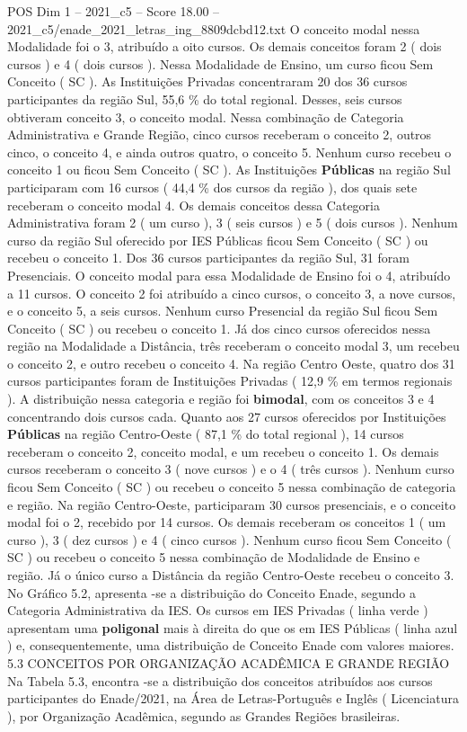 \begin{textsample}{POS Dim 1 – 2021\_c5 – Score 18.00 – 2021\_c5/enade\_2021\_letras\_ing\_8809dcbd12.txt}
O conceito modal nessa Modalidade foi o 3, atribuído a oito cursos.
Os demais conceitos foram 2 ( dois cursos ) e 4 ( dois cursos ).
Nessa Modalidade de Ensino, um curso ficou Sem Conceito ( SC ).
As Instituições Privadas concentraram 20 dos 36 cursos participantes da região Sul, 55,6 \% do total regional.
Desses, seis cursos obtiveram conceito 3, o conceito modal.
Nessa combinação de Categoria Administrativa e Grande Região, cinco cursos receberam o conceito 2, outros cinco, o conceito 4, e ainda outros quatro, o conceito 5.
Nenhum curso recebeu o conceito 1 ou ficou Sem Conceito ( SC ).
As Instituições \textbf{Públicas} na região Sul participaram com 16 cursos ( 44,4 \% dos cursos da região ), dos quais sete receberam o conceito modal 4.
Os demais conceitos dessa Categoria Administrativa foram 2 ( um curso ), 3 ( seis cursos ) e 5 ( dois cursos ).
Nenhum curso da região Sul oferecido por IES Públicas ficou Sem Conceito ( SC ) ou recebeu o conceito 1.
Dos 36 cursos participantes da região Sul, 31 foram Presenciais.
O conceito modal para essa Modalidade de Ensino foi o 4, atribuído a 11 cursos.
O conceito 2 foi atribuído a cinco cursos, o conceito 3, a nove cursos, e o conceito 5, a seis cursos.
Nenhum curso Presencial da região Sul ficou Sem Conceito ( SC ) ou recebeu o conceito 1.
Já dos cinco cursos oferecidos nessa região na Modalidade a Distância, três receberam o conceito modal 3, um recebeu o conceito 2, e outro recebeu o conceito 4.
Na região Centro Oeste, quatro dos 31 cursos participantes foram de Instituições Privadas ( 12,9 \% em termos regionais ).
A distribuição nessa categoria e região foi \textbf{bimodal}, com os conceitos 3 e 4 concentrando dois cursos cada.
Quanto aos 27 cursos oferecidos por Instituições \textbf{Públicas} na região Centro-Oeste ( 87,1 \% do total regional ), 14 cursos receberam o conceito 2, conceito modal, e um recebeu o conceito 1.
Os demais cursos receberam o conceito 3 ( nove cursos ) e o 4 ( três cursos ).
Nenhum curso ficou Sem Conceito ( SC ) ou recebeu o conceito 5 nessa combinação de categoria e região.
Na região Centro-Oeste, participaram 30 cursos presenciais, e o conceito modal foi o 2, recebido por 14 cursos.
Os demais receberam os conceitos 1 ( um curso ), 3 ( dez cursos ) e 4 ( cinco cursos ).
Nenhum curso ficou Sem Conceito ( SC ) ou recebeu o conceito 5 nessa combinação de Modalidade de Ensino e região.
Já o único curso a Distância da região Centro-Oeste recebeu o conceito 3.
No Gráfico 5.2, apresenta -se a distribuição do Conceito Enade, segundo a Categoria Administrativa da IES.
Os cursos em IES Privadas ( linha verde ) apresentam uma \textbf{poligonal} mais à direita do que os em IES Públicas ( linha azul ) e, consequentemente, uma distribuição de Conceito Enade com valores maiores. 5.3 CONCEITOS POR ORGANIZAÇÃO ACADÊMICA E GRANDE REGIÃO Na Tabela 5.3, encontra -se a distribuição dos conceitos atribuídos aos cursos participantes do Enade/2021, na Área de Letras-Português e Inglês ( Licenciatura ), por Organização Acadêmica, segundo as Grandes Regiões brasileiras.

\end{textsample}
